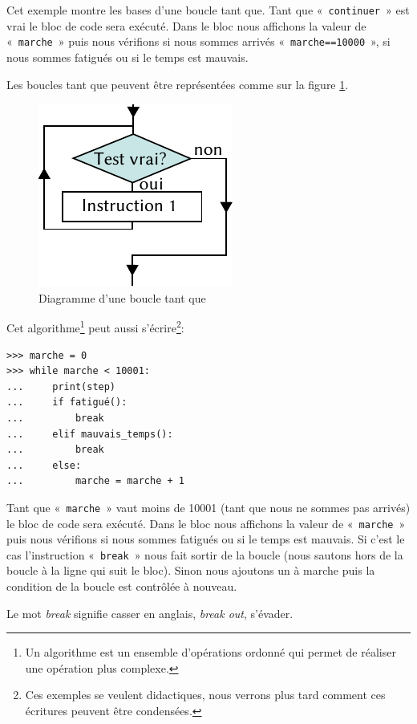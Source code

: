 Cet exemple montre les bases d'une boucle tant que. Tant que « \texttt{continuer} » est vrai le bloc de code sera exécuté. Dans le bloc nous affichons la valeur de « \texttt{marche} » puis nous vérifions si nous sommes arrivés « \texttt{marche==10000} », si nous sommes fatigués ou si le temps est mauvais.

Les boucles tant que peuvent être représentées comme sur la figure \ref{fig:Cf-while-fr}.
\begin{figure}[h!]
\centering
\includegraphics[scale=1.5]{images/Cf-while-fr.pdf}
\caption{Diagramme d'une boucle tant que}
\label{fig:Cf-while-fr}
\end{figure}

Cet algorithme\footnote{Un algorithme est un ensemble d'opérations ordonné qui permet de réaliser une opération plus complexe.} peut aussi s'écrire\footnote{Ces exemples se veulent didactiques, nous verrons plus tard comment ces écritures peuvent être condensées.}:

\begin{Verbatim}[frame=single,rulecolor=\color{gray}, label=ne pas saisir]
>>> marche = 0
>>> while marche < 10001:
...     print(step)
...     if fatigué():
...         break
...     elif mauvais_temps():
...         break
...     else:
...         marche = marche + 1 
\end{Verbatim}

Tant que « \texttt{marche} » vaut moins de 10001 (tant que nous ne sommes pas arrivés) le bloc de code sera exécuté. Dans le bloc nous affichons la valeur de « \texttt{marche} » puis nous vérifions si nous sommes fatigués ou si le temps est mauvais. Si c'est le cas l'instruction « \texttt{break} » nous fait sortir de la boucle (nous sautons hors de la boucle à la ligne qui suit le bloc). Sinon nous ajoutons un à marche puis la condition de la boucle est contrôlée à nouveau.

Le mot \emph{break} signifie casser en anglais, \emph{break out}, s'évader.\\


